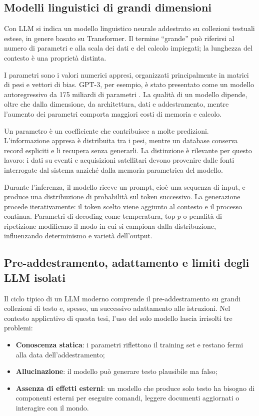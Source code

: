 \subsection{Modelli linguistici di grandi dimensioni}

Con LLM si indica un modello linguistico neurale addestrato su collezioni testuali
estese, in genere basato su Transformer. Il termine ``grande'' può riferirsi al
numero di parametri e alla scala dei dati e del calcolo impiegati; la lunghezza
del contesto è una proprietà distinta.

I parametri sono i valori numerici appresi, organizzati principalmente in matrici
di pesi e vettori di bias. GPT-3, per esempio, è stato presentato come un modello
autoregressivo da 175 miliardi di parametri \cite{brownGPT3}. La qualità di un
modello dipende, oltre che dalla dimensione, da architettura, dati e addestramento, mentre l'aumento dei parametri comporta maggiori costi di memoria
e calcolo.

Un parametro è un coefficiente che contribuisce a molte predizioni. L'informazione appresa è distribuita tra i
pesi, mentre un database conserva record espliciti e li recupera senza
generarli. La distinzione è rilevante per questo lavoro: i dati su eventi e
acquisizioni satellitari devono provenire dalle fonti interrogate dal sistema
anziché dalla memoria parametrica del modello.

Durante l'inferenza, il modello riceve un prompt, cioè una sequenza di input, e produce una distribuzione di probabilità sul token successivo. La generazione procede iterativamente: il token scelto viene aggiunto al contesto e il processo continua. Parametri di decoding come temperatura, top-$p$ o penalità di ripetizione modificano il modo in cui si campiona dalla distribuzione, influenzando determinismo e varietà dell'output.

\subsection{Pre-addestramento, adattamento e limiti degli LLM isolati}

Il ciclo tipico di un LLM moderno comprende il pre-addestramento su grandi
collezioni di testo e, spesso, un successivo adattamento alle istruzioni. Nel
contesto applicativo di questa tesi, l'uso del solo modello lascia irrisolti tre
problemi:
\begin{itemize}
    \item \textbf{Conoscenza statica}: i parametri riflettono il training set e restano fermi alla data dell'addestramento;
    \item \textbf{Allucinazione}: il modello può generare testo plausibile ma falso;
    \item \textbf{Assenza di effetti esterni}: un modello che produce solo testo ha bisogno di componenti esterni per eseguire comandi, leggere documenti aggiornati o interagire con il mondo.
\end{itemize}

